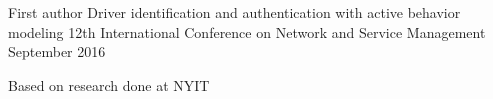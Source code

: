 

\begin{cventries}

  \cventry
    {First author} %
    {Driver identification and authentication with active behavior modeling} %
    {12th International Conference on Network and Service Management} %
    {September 2016} %
    {
      \begin{cvitems} %
        \item {Based on research done at NYIT}
      \end{cvitems}
    }

\end{cventries}
